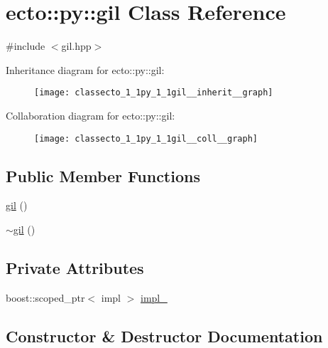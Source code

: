 \hypertarget{classecto_1_1py_1_1gil}{}\section{ecto\+:\+:py\+:\+:gil Class Reference}
\label{classecto_1_1py_1_1gil}


{\ttfamily \#include $<$gil.\+hpp$>$}



Inheritance diagram for ecto\+:\+:py\+:\+:gil\+:\nopagebreak
\begin{figure}[H]
\begin{center}
\leavevmode
\texttt{[image: classecto\_1\_1py\_1\_1gil\_\_inherit\_\_graph]}
\end{center}
\end{figure}


Collaboration diagram for ecto\+:\+:py\+:\+:gil\+:\nopagebreak
\begin{figure}[H]
\begin{center}
\leavevmode
\texttt{[image: classecto\_1\_1py\_1\_1gil\_\_coll\_\_graph]}
\end{center}
\end{figure}
\subsection*{Public Member Functions}
\begin{DoxyCompactItemize}
\item 
\hyperlink{classecto_1_1py_1_1gil_aad7e0cb610b4766dbdfa918227e806cc}{gil} ()
\item 
\hyperlink{classecto_1_1py_1_1gil_a18685c76c39837ddf90159fb0721ab62}{$\sim$gil} ()
\end{DoxyCompactItemize}
\subsection*{Private Attributes}
\begin{DoxyCompactItemize}
\item 
boost\+::scoped\+\_\+ptr$<$ impl $>$ \hyperlink{classecto_1_1py_1_1gil_af91dedbf0eb88a914bacb64ff176bf93}{impl\+\_\+}
\end{DoxyCompactItemize}


\subsection{Constructor \& Destructor Documentation}
